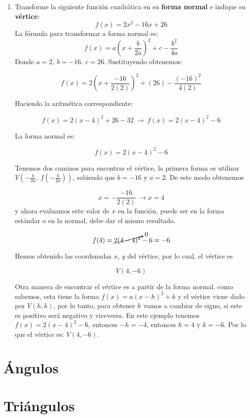 \documentclass[A4paper, 10pt, oneside]{book}
\begin{document}
	\begin{enumerate}
		\item Transforme la siguiente función cuadrática en su \textbf{forma normal} e indique su \textbf{vértice}: $$f(x)=2x^2-16x+26$$\newline
		La fórmula para transformar a forma normal es: $$f(x)=a\left(x+\frac{b}{2a}\right)^2+c-\frac{b^2}{4a}$$ Donde $a=2, \ b=-16, \ c=26$. Sustituyendo obtenemos:
		
		$$f(x)=2\left(x+\frac{-16}{2(2)}\right)^2+(26)-\frac{(-16)^2}{4(2)}$$
		
		Haciendo la aritmética correspondiente:
		
		$$f(x)=2\left(x-4\right)^2+26-32 \ \rightarrow \ f(x)=2(x-4)^2-6$$
		
		La forma normal es:
		\begin{tcolorbox}[colback=white]
			$$f(x)=2(x-4)^2-6$$
		\end{tcolorbox}
		
		Tenemos dos caminos para encontrar el vértice, la primera forma es utilizar $\displaystyle{V\left(-\frac{b}{2a}, \ f\left(-\frac{b}{2a}\right)\right)}$, sabiendo que $b=-16$ y $a=2$. De este modo obtenemos
		
		$$x=-\frac{-16}{2(2)}\ \rightarrow x=4$$ y ahora evaluamos este valor de $x$ en la función, puede ser en la forma estándar o en la normal, debe dar el mismo resultado.
		
		$$f(4)=\cancelto{0}{2(4-4)^2}-6 = -6$$
		
		Hemos obtenido las coordenadas $x$, $y$ del vértice, por lo cual, el vértice es
		
		\begin{tcolorbox}
			$$V(4, -6)$$
		\end{tcolorbox}
		
		Otra manera de encontrar el vértice es a partir de la forma normal, como sabemos, esta tiene la forma $f(x)=a(x-h)^2+k$ y el vértice viene dado por $V(h, k)$, por lo tanto, para obtener $h$ vamos a cambiar de signo, si este es positivo será negativo y viceversa. En este ejemplo tenemos $f(x)=2(x-4)^2-6$, entonces $-h=-4$, entonces $h=4$ y $k=-6$. Por lo que el vértice es: $V(4, -6)$.
	\end{enumerate}
	\chapter{Ángulos}
	\chapter{Triángulos}
	
\end{document}
